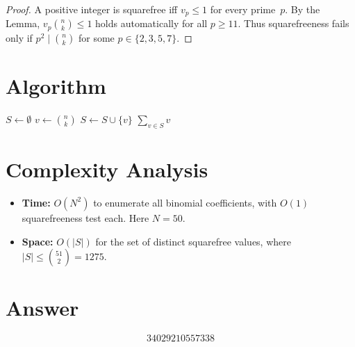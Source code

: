 \documentclass[12pt]{article}
\begin{document}
\begin{proof}
A positive integer is squarefree iff $v_p \leq 1$ for every prime~$p$. By the Lemma,
$v_p\binom{n}{k} \leq 1$ holds automatically for all $p \geq 11$. Thus squarefreeness
fails only if $p^2 \mid \binom{n}{k}$ for some $p \in \{2,3,5,7\}$.
\end{proof}

\section{Algorithm}

\begin{algorithmic}[1]
\State $S \gets \emptyset$
        \State $v \gets \binom{n}{k}$
            \State $S \gets S \cup \{v\}$
        \EndIf
    \EndFor
\EndFor
\State \Return $\sum_{v \in S} v$
\end{algorithmic}

\section{Complexity Analysis}
\begin{itemize}
    \item \textbf{Time:} $O(N^2)$ to enumerate all binomial coefficients, with $O(1)$
          squarefreeness test each. Here $N = 50$.
    \item \textbf{Space:} $O(|S|)$ for the set of distinct squarefree values,
          where $|S| \leq \binom{51}{2} = 1275$.
\end{itemize}

\section{Answer}

\[
\boxed{34029210557338}
\]
\end{document}
